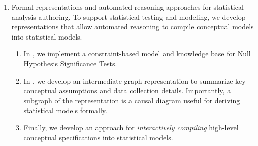 \begin{enumerate}
    \item Formal representations and automated reasoning approaches for
    statistical analysis authoring. To support statistical testing and modeling,
    we develop representations that allow automated reasoning to compile
    conceptual models into statistical models. 
    \begin{enumerate}
        \item In \tea, we implement a constraint-based model and knowledge base
        for Null Hypothesis Significance Tests. 
        \item In \tisane, we develop an intermediate graph representation to
        summarize key conceptual assumptions and data collection details.
        Importantly, a subgraph of the representation is a causal diagram useful
        for deriving statistical models formally. 
        \item Finally, we develop an approach for \textit{interactively
        compiling} high-level conceptual specifications into statistical models.
    \end{enumerate}
\end{enumerate}

